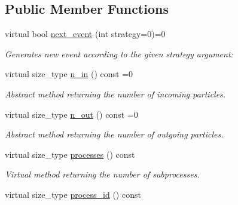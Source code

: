 \subsection*{Public Member Functions}
\begin{DoxyCompactItemize}
\item 
\hypertarget{a00442_adeb74015a97b7489f511c39eaaf6c00b}{virtual bool \hyperlink{a00442_adeb74015a97b7489f511c39eaaf6c00b}{next\-\_\-event} (int strategy=0)=0}\label{a00442_adeb74015a97b7489f511c39eaaf6c00b}

\begin{DoxyCompactList}\small\item\em Generates new event according to the given strategy argument\-: \end{DoxyCompactList}\item 
\hypertarget{a00442_a8f890e649f7ac1165f881ce33673b34e}{virtual size\-\_\-type \hyperlink{a00442_a8f890e649f7ac1165f881ce33673b34e}{n\-\_\-in} () const =0}\label{a00442_a8f890e649f7ac1165f881ce33673b34e}

\begin{DoxyCompactList}\small\item\em Abstract method returning the number of incoming particles. \end{DoxyCompactList}\item 
\hypertarget{a00442_a8dfbca7dcaea0433c1edebdd8e41b8a2}{virtual size\-\_\-type \hyperlink{a00442_a8dfbca7dcaea0433c1edebdd8e41b8a2}{n\-\_\-out} () const =0}\label{a00442_a8dfbca7dcaea0433c1edebdd8e41b8a2}

\begin{DoxyCompactList}\small\item\em Abstract method returning the number of outgoing particles. \end{DoxyCompactList}\item 
\hypertarget{a00442_ac165d06105c65340f233bd5eca2b36f0}{virtual size\-\_\-type \hyperlink{a00442_ac165d06105c65340f233bd5eca2b36f0}{processes} () const }\label{a00442_ac165d06105c65340f233bd5eca2b36f0}

\begin{DoxyCompactList}\small\item\em Virtual method returning the number of subprocesses. \end{DoxyCompactList}\item 
\hypertarget{a00442_adfb405d7843911aeb99a03379c7ec66b}{virtual size\-\_\-type \hyperlink{a00442_adfb405d7843911aeb99a03379c7ec66b}{process\-\_\-id} () const }\label{a00442_adfb405d7843911aeb99a03379c7ec66b}


\end{DoxyCompactItemize}
